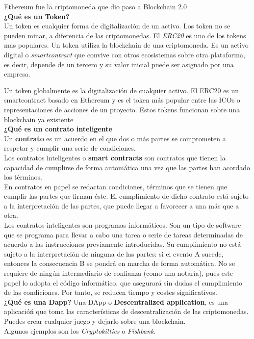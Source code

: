 \documentclass[a4paper,12pt]{/home/armando/Documentos/Cursos/LaTeX/Plantillas/lib/pub}
\begin{document}
Ethereum fue la criptomoneda que dio paso a Blockchain 2.0\\

\textbf{¿Qué es un Token?}\\
Un token es cualquier forma de digitalización de un activo. Los token no se pueden minar, a diferencia de las criptomonedas. El \textit{ERC20} es uno de los tokens mas populares. Un token utiliza la blockchain de una criptomoneda.
Es un activo digital o \textit{smartcontract} que convive con otros ecosistemas sobre otra plataforma, es decir, depende de un tercero y su valor inicial puede ser asignado por una empresa.

Un token globalmente es la digitalización de cualquier activo. El ERC20 es un smartcontract basado en Ethereum y es el token más popular entre las ICOs o representaciones de acciones de un proyecto. Estos tokens funcionan sobre una blockchain ya existente\\

\textbf{¿Qué es un contrato inteligente}\\
Un \textbf{contrato} es un acuerdo en el que dos o más partes se comprometen a respetar y cumplir una serie de condiciones.\\
Los contratos inteligentes o \textbf{smart contracts} son contratos que tienen la capacidad de cumplirse de forma automática una vez que las partes han acordado los términos.
\\
En contratos en papel se redactan condiciones, términos que se tienen que cumplir las partes que firman éste. El cumplimiento de dicho contrato está sujeto a la interpretación de las partes, que puede llegar a favorecer a una más que a otra.\\

Los contratos inteligentes son programas informáticos. Son un tipo de software que se programa para llevar a cabo una tarea o serie de tareas determinadas de acuerdo a las instrucciones previamente introducidas. Su cumplimiento no está sujeto a la interpretación de ninguna de las partes: si el evento A sucede, entonces la consecuencia B se pondrá en marcha de forma automática. No se requiere de ningún intermediario de confianza (como una notaría), pues este papel lo adopta el código informático, que asegurará sin dudas el cumplimiento de las condiciones. Por tanto, se reducen tiempo y costes significativos.\\

\textbf{¿Qué es una Dapp?}
Una DApp o \textbf{Descentralized application}, es una aplicacióń que toma las características de descentralización de las criptomonedas. Puedes crear cualquier juego y dejarlo sobre una blockchain.\\ Algunos ejemplos son los \textit{Cryptokitties} o \textit{Fishbank}.
\end{document}
